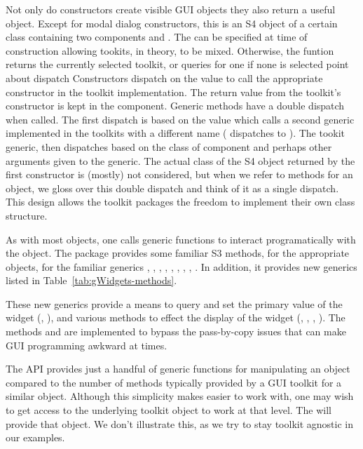 Not only do constructors create visible GUI objects they also return a
useful \R\/ object. Except for modal dialog constructors, this is an
S4 object of a certain class containing two components 
and . The  can be specified at time of
construction allowing tookits, in theory, to be mixed. Otherwise, the
 funtion returns the currently selected toolkit, or
queries for one if none is selected point about dispatch
Constructors dispatch on the  value to call the appropriate
constructor in the toolkit implementation. The return value from the
toolkit's constructor is kept in the  component.  Generic
methods have a double dispatch when called. The first dispatch is
based on the  value which calls a second generic
implemented in the toolkits with a different name (
dispatches to ). The tookit generic, then dispatches
based on the class of  component and perhaps other
arguments given to the generic. The actual class of the S4 object
returned by the first constructor is (mostly) not considered, but when
we refer to methods for an object, we gloss over this double dispatch
and think of it as a single dispatch. This design allows the toolkit
packages the freedom to implement their own class structure. 

As with most \R\/ objects, one calls generic functions to interact
programatically with the object. The  package
provides some familiar S3 methods, for the appropriate objects, for the
familiar generics \generic{[}, \generic{[$<$-}, ,
, , ,
, , . In
addition, it provides new generics listed in
Table~\ref{tab:gWidgets-methods}. 

These new generics provide a means to query and set the primary value
of the widget (, ), and various methods
to effect the display of the widget (,
, , ). The
methods  and  are implemented to bypass the
pass-by-copy issues that can make GUI programming awkward at times.


The  API provides just a handful of generic functions
for manipulating an object compared to the number of methods typically
provided by a GUI toolkit for a similar object. Although this
simplicity makes  easier to work with, one may wish to
get access to the underlying toolkit object to work at that level. The
 will provide that object. We don't
illustrate this, as we try to stay toolkit agnostic in our examples.


